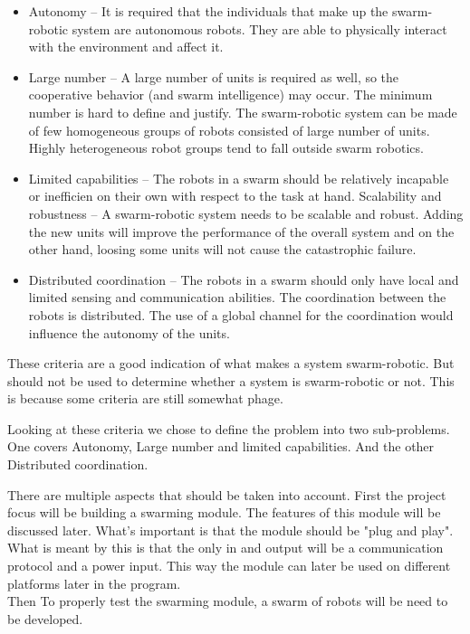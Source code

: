 \documentclass[10pt,a4paper]{article}
\begin{document}
\begin{itemize}
    \item Autonomy – It is required that the individuals that make up   the swarm-robotic system are autonomous robots. They are able to        physically      interact with the environment and affect it.
    \item Large number – A large number of units is required
    as well, so the cooperative behavior (and
    swarm intelligence) may occur. The minimum number
    is hard to define and justify. The swarm-robotic
    system can be made of few homogeneous groups of
    robots consisted of large number of units. Highly heterogeneous 
    robot groups tend to fall outside swarm
    robotics.
    \item Limited capabilities – The robots in a swarm
    should be relatively incapable or inefficien on their
    own with respect to the task at hand.
    Scalability and robustness – A swarm-robotic
    system needs to be scalable and robust. Adding the
    new units will improve the performance of the overall
    system and on the other hand, loosing some units will
    not cause the catastrophic failure.
    \item Distributed coordination – The robots in a swarm
    should only have local and limited sensing and communication
    abilities. The coordination between the
    robots is distributed. The use of a global channel for
    the coordination would influence the autonomy of the
    units.
\end{itemize}

These criteria are a good indication of what makes a system swarm-robotic. But should not be used to determine whether a system is swarm-robotic or not. This is because some criteria are still somewhat phage\cite{swarmintelligence}.

Looking at these criteria we chose to define the problem into two sub-problems. One covers Autonomy, Large number and limited capabilities. And the other Distributed coordination. 

There are multiple aspects that should be taken into account. First the project focus will be building a swarming module. The features of this module will be discussed later. What's important is that the module should be "plug and play". What is meant by this is that the only in and output will be a communication protocol and a power input. This way the module can later be used on different platforms later in the program.\\ Then To properly test the swarming module, a swarm of robots will be need to be developed.
\end{document}
